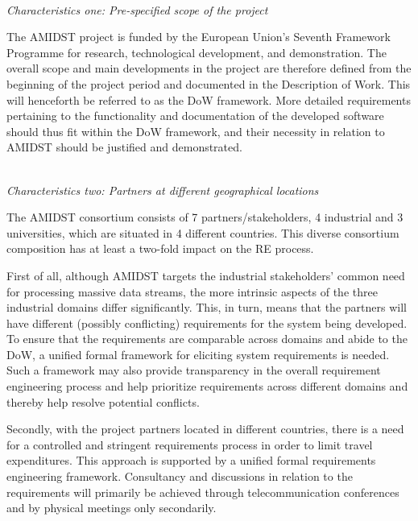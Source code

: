 \ \\
\noindent \emph{Characteristics one:  Pre-specified scope of the project}
\label{sec:characteristic1}

The AMIDST project is funded by the European Union's Seventh Framework Programme for research, technological
development, and demonstration. The overall scope and main developments in the project are therefore defined from the
beginning of the project period and documented in the Description of Work. This will henceforth be referred to
as the DoW framework. More detailed requirements pertaining
to the functionality and documentation of the developed software should thus fit within the DoW framework, and their
necessity in relation to AMIDST should be justified and demonstrated.   


 


\ \\
\noindent \emph{Characteristics two: Partners at different geographical locations}
\label{sec:characteristic2}

The AMIDST consortium consists of 7 partners/stakeholders, 4 industrial and 3 universities, which are situated in 4 different
countries. This diverse consortium composition has at least a two-fold impact on the RE process.

First of
all, although AMIDST targets the industrial stakeholders' common need for processing massive data streams, the more
intrinsic aspects of the three industrial domains differ significantly. This, in turn, means that the partners will have different
(possibly conflicting) requirements for the system being developed. To ensure that the requirements are comparable
across domains and abide to the DoW, a unified formal framework for eliciting system requirements is needed. Such a
framework may also provide transparency in the overall requirement engineering process and help prioritize requirements
across different domains and thereby help resolve potential conflicts.   

Secondly, with the project partners located in different countries, there is a need for a controlled and stringent requirements
process in order to limit travel expenditures. This approach is supported by a unified formal requirements
engineering framework. Consultancy and discussions in relation to the
requirements will primarily be achieved through telecommunication conferences and by physical meetings only secondarily. 
 
